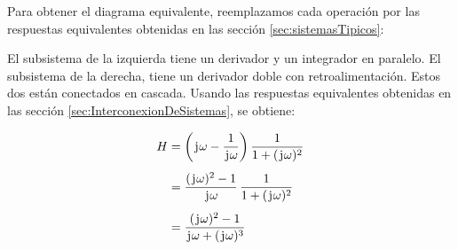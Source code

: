 \begin{mdframed}[style=ExampleFrame]

    Para obtener el diagrama equivalente, reemplazamos cada operación por las respuestas equivalentes obtenidas en las sección \ref{sec:sistemasTipicos}:

    \begin{center}
        \def\svgwidth{\linewidth}
        
    \end{center}


    El subsistema de la izquierda tiene un derivador y un integrador en paralelo.
    El subsistema de la derecha, tiene un derivador doble con retroalimentación.
    Estos dos están conectados en cascada.
    Usando las respuestas equivalentes obtenidas en las sección \ref{sec:InterconexionDeSistemas}, se obtiene:

    \begin{align*}
        H
        &= \left(\mkern2mu\mathrm{j}\mkern1mu \omega - \frac{1}{\mkern2mu\mathrm{j}\mkern1mu \omega}\right) \frac{1}{1 + (\mkern2mu\mathrm{j}\mkern1mu \omega)^2}
        \\[1ex]
        &= \frac{(\mkern2mu\mathrm{j}\mkern1mu \omega)^2 - 1}{\mkern2mu\mathrm{j}\mkern1mu \omega} \, \frac{1}{1 + (\mkern2mu\mathrm{j}\mkern1mu \omega)^2}
        \\[1ex]
        &= \frac{(\mkern2mu\mathrm{j}\mkern1mu \omega)^2 - 1}{\mkern2mu\mathrm{j}\mkern1mu \omega + (\mkern2mu\mathrm{j}\mkern1mu \omega)^3}
    \end{align*}
\end{mdframed}

